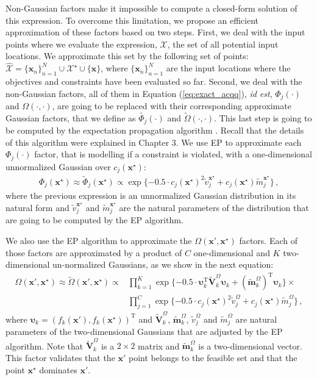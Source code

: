 Non-Gaussian factors make it impossible to compute a closed-form solution of this expression. To overcome this limitation, we propose an efficient approximation of these factors based on two steps. First, we deal with the input points where we evaluate the expression, $\mathcal{X}$, the set of all potential input locations. We approximate this set by the following set of points:
$\hat{\mathcal{X}} = \{\textbf{x}_n\}_{n=1}^{N} \cup \mathcal{X}^{\star} \cup \{\textbf{x}\}$,
where $\{\textbf{x}_n\}_{n=1}^{N}$ are the input locations where the objectives and constraints
have been evaluated so far. Second, we deal with the non-Gaussian factors, all of them in Equation (\ref{eq:exact_acqq}),
\emph{id est}, $\Phi_j(\cdot)$ and $\Omega(\cdot, \cdot)$, are going to be replaced with their corresponding approximate
Gaussian factors, that we define as $\tilde{\Phi_j}(\cdot)$ and $\tilde{\Omega}(\cdot, \cdot)$. This last step is
going to be computed by the expectation propagation algorithm \citep{minka2001expectation}. Recall that the details of this algorithm were explained in Chapter 3.
We use EP to approximate each $\Phi_j(\cdot)$ factor, that is modelling if a constraint is violated, with a one-dimensional unnormalized Gaussian over $c_j(\mathbf{x}^\star)$:
\begin{align}
\Phi_j(\mathbf{x}^\star) \approx \tilde{\Phi}_j(\mathbf{x}^\star) \propto
        \exp\{-0.5 \cdot c_j(\mathbf{x}^\star)^2\tilde{v}_j^{\mathbf{x}^\star} + 
        c_j(\mathbf{x}^\star) \tilde{m}_j^{\mathbf{x}^\star}\}\,,
\end{align}
where the previous expression is an unnormalized Gaussian distribution in its natural form and $\tilde{v}_j^{\mathbf{x}^\star}$ and $\tilde{m}_j^{\mathbf{x}^\star}$ are the natural parameters of the distribution that are going to be computed by the EP algorithm.

We also use the EP algorithm to approximate the $\Omega(\textbf{x}',\textbf{x}^{\star})$ factors. Each of those factors are approximated by a product of $C$
one-dimensional and $K$ two-dimensional un-normalized Gaussians, as we show in the next equation:
\begin{align}
\Omega(\mathbf{x}',\mathbf{x}^\star) \approx
\tilde{\Omega}(\mathbf{x}',\mathbf{x}^\star)  \propto &
\prod_{k=1}^K \exp \{-0.5 \cdot \bm{\upsilon}_k^\text{T} \tilde{\mathbf{V}}_k^{\Omega} 
        \bm{\upsilon}_k + (\tilde{\mathbf{m}}_k^{\Omega})^\text{T} \bm{\upsilon}_k \} \times \nonumber \\
        & \prod_{j=1}^C 
        \exp\{-0.5 \cdot c_j(\mathbf{x}^\star)^2\tilde{v}_j^{\Omega} + c_j(\mathbf{x}^\star) \tilde{m}_j^{\Omega}\}
\,,
\end{align}
where $\bm{\upsilon}_k=(f_k(\mathbf{x}'),f_k(\mathbf{x}^\star))^\text{T}$ and
$\tilde{\mathbf{V}}_k^{\Omega}$, $\tilde{\mathbf{m}}_k^{\Omega}$,
$\tilde{v}_j^{\Omega}$ and $\tilde{m}_j^{\Omega}$ are
natural parameters of the two-dimensional Gaussians that are adjusted by the EP algorithm. Note that $\tilde{\mathbf{V}}_k^{\Omega}$ is a $2 \times 2$ matrix and $\tilde{\mathbf{m}}_k^{\Omega}$ is a two-dimensional vector. This factor validates that the $\mathbf{x}'$ point belongs to the feasible set and that the point $\mathbf{x}^{\star}$ dominates $\mathbf{x}'$.

